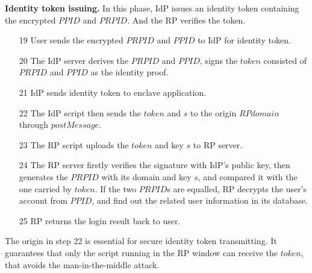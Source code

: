 \vspace{3mm}\noindent\textbf{Identity token issuing.} In this phase, IdP issues an identity token containing the encrypted $PPID$ and $PRPID$. And the RP verifies the token.
\begin{itemize}
\item[19]User sends the encrypted $PRPID$ and $PPID$ to IdP for identity token.
\item[20]The IdP server derives the $PRPID$ and $PPID$, signs the $token$ consisted of $PRPID$ and $PPID$ as the identity proof.
\item[21]IdP sends identity token to enclave application.
\item[22]The IdP script then sends the $token$ and $s$ to the origin $RPdomain$ through $postMessage$.
\item[23]The RP script uploads the $token$ and key $s$ to RP server.
\item[24]The RP server firstly verifies the signature with IdP's public key, then generates the $PRPID$ with its domain and key $s$, and compared it with the one carried by $token$. If the two $PRPID$s are equalled, RP decrypts the user's account from $PPID$, and find out the related user information in its database.
\item[25]RP returns the login result back to user.
\end{itemize} 
The origin in step 22 is essential for secure identity token transmitting.
It guarantees that only the script running in the RP window can receive the $token$, that avoids the man-in-the-middle attack.

